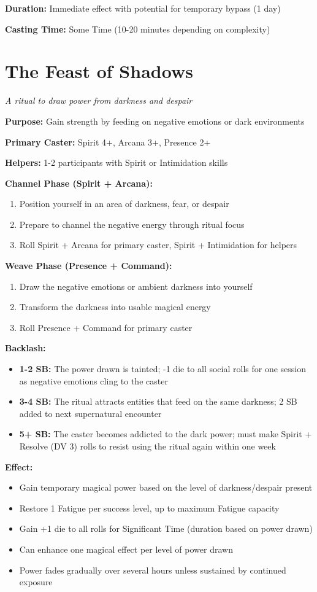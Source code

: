 \textbf{Duration:} Immediate effect with potential for temporary bypass (1 day)

\textbf{Casting Time:} Some Time (10-20 minutes depending on complexity)

\section*{The Feast of Shadows}
\textit{A ritual to draw power from darkness and despair}

\textbf{Purpose:} Gain strength by feeding on negative emotions or dark environments

\textbf{Primary Caster:} Spirit 4+, Arcana 3+, Presence 2+

\textbf{Helpers:} 1-2 participants with Spirit or Intimidation skills

\textbf{Channel Phase (Spirit + Arcana):}
\begin{enumerate}
\item Position yourself in an area of darkness, fear, or despair
\item Prepare to channel the negative energy through ritual focus
\item Roll Spirit + Arcana for primary caster, Spirit + Intimidation for helpers
\end{enumerate}

\textbf{Weave Phase (Presence + Command):}
\begin{enumerate}
\item Draw the negative emotions or ambient darkness into yourself
\item Transform the darkness into usable magical energy
\item Roll Presence + Command for primary caster
\end{enumerate}

\textbf{Backlash:}
\begin{itemize}
\item \textbf{1-2 SB:} The power drawn is tainted; -1 die to all social rolls for one session as negative emotions cling to the caster
\item \textbf{3-4 SB:} The ritual attracts entities that feed on the same darkness; 2 SB added to next supernatural encounter
\item \textbf{5+ SB:} The caster becomes addicted to the dark power; must make Spirit + Resolve (DV 3) rolls to resist using the ritual again within one week
\end{itemize}

\textbf{Effect:}
\begin{itemize}
\item Gain temporary magical power based on the level of darkness/despair present
\item Restore 1 Fatigue per success level, up to maximum Fatigue capacity
\item Gain +1 die to all rolls for Significant Time (duration based on power drawn)
\item Can enhance one magical effect per level of power drawn
\item Power fades gradually over several hours unless sustained by continued exposure
\end{itemize}

